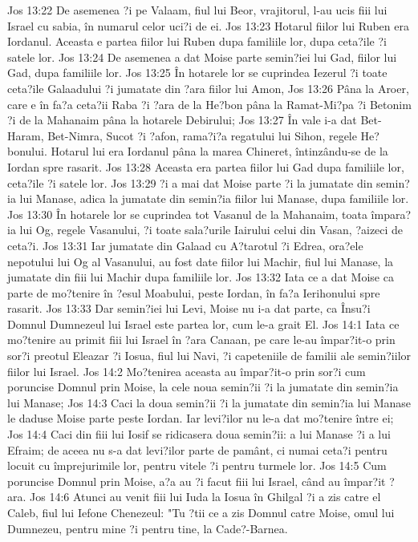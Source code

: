 Jos 13:22  De asemenea ?i pe Valaam, fiul lui Beor, vrajitorul, l-au ucis fiii lui Israel cu sabia, în numarul celor uci?i de ei.
Jos 13:23  Hotarul fiilor lui Ruben era Iordanul. Aceasta e partea fiilor lui Ruben dupa familiile lor, dupa ceta?ile ?i satele lor.
Jos 13:24  De asemenea a dat Moise parte semin?iei lui Gad, fiilor lui Gad, dupa familiile lor.
Jos 13:25  În hotarele lor se cuprindea Iezerul ?i toate ceta?ile Galaadului ?i jumatate din ?ara fiilor lui Amon,
Jos 13:26  Pâna la Aroer, care e în fa?a ceta?ii Raba ?i ?ara de la He?bon pâna la Ramat-Mi?pa ?i Betonim ?i de la Mahanaim pâna la hotarele Debirului;
Jos 13:27  În vale i-a dat Bet-Haram, Bet-Nimra, Sucot ?i ?afon, rama?i?a regatului lui Sihon, regele He?bonului. Hotarul lui era Iordanul pâna la marea Chineret, întinzându-se de la Iordan spre rasarit.
Jos 13:28  Aceasta era partea fiilor lui Gad dupa familiile lor, ceta?ile ?i satele lor.
Jos 13:29  ?i a mai dat Moise parte ?i la jumatate din semin?ia lui Manase, adica la jumatate din semin?ia fiilor lui Manase, dupa familiile lor.
Jos 13:30  În hotarele lor se cuprindea tot Vasanul de la Mahanaim, toata împara?ia lui Og, regele Vasanului, ?i toate sala?urile Iairului celui din Vasan, ?aizeci de ceta?i.
Jos 13:31  Iar jumatate din Galaad cu A?tarotul ?i Edrea, ora?ele nepotului lui Og al Vasanului, au fost date fiilor lui Machir, fiul lui Manase, la jumatate din fiii lui Machir dupa familiile lor.
Jos 13:32  Iata ce a dat Moise ca parte de mo?tenire în ?esul Moabului, peste Iordan, în fa?a Ierihonului spre rasarit.
Jos 13:33  Dar semin?iei lui Levi, Moise nu i-a dat parte, ca Însu?i Domnul Dumnezeul lui Israel este partea lor, cum le-a grait El.
Jos 14:1  Iata ce mo?tenire au primit fiii lui Israel în ?ara Canaan, pe care le-au împar?it-o prin sor?i preotul Eleazar ?i Iosua, fiul lui Navi, ?i capeteniile de familii ale semin?iilor fiilor lui Israel.
Jos 14:2  Mo?tenirea aceasta au împar?it-o prin sor?i cum poruncise Domnul prin Moise, la cele noua semin?ii ?i la jumatate din semin?ia lui Manase;
Jos 14:3  Caci la doua semin?ii ?i la jumatate din semin?ia lui Manase le daduse Moise parte peste Iordan. Iar levi?ilor nu le-a dat mo?tenire între ei;
Jos 14:4  Caci din fiii lui Iosif se ridicasera doua semin?ii: a lui Manase ?i a lui Efraim; de aceea nu s-a dat levi?ilor parte de pamânt, ci numai ceta?i pentru locuit cu împrejurimile lor, pentru vitele ?i pentru turmele lor.
Jos 14:5  Cum poruncise Domnul prin Moise, a?a au ?i facut fiii lui Israel, când au împar?it ?ara.
Jos 14:6  Atunci au venit fiii lui Iuda la Iosua în Ghilgal ?i a zis catre el Caleb, fiul lui Iefone Chenezeul: "Tu ?tii ce a zis Domnul catre Moise, omul lui Dumnezeu, pentru mine ?i pentru tine, la Cade?-Barnea.
